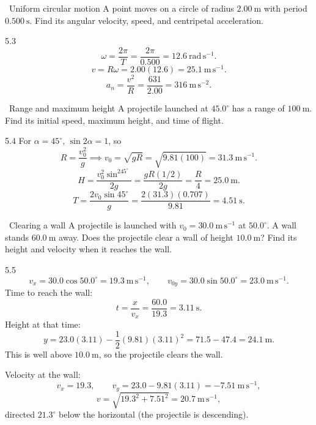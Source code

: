 \begin{exercise}{\warm\ Uniform circular motion}
A point moves on a circle of radius $2.00\ \mathrm{m}$ with period
$0.500\ \mathrm{s}$. Find its angular velocity, speed, and centripetal
acceleration.
\end{exercise}

\begin{tabletworkspace}[6.5cm]
\end{tabletworkspace}

\begin{solution}{5.3}
\[
\omega=\frac{2\pi}{T}=\frac{2\pi}{0.500}=12.6\ \mathrm{rad\,s^{-1}}.
\]
\[
v=R\omega=2.00(12.6)=25.1\ \mathrm{m\,s^{-1}}.
\]
\[
a_n=\frac{v^2}{R}=\frac{631}{2.00}=316\ \mathrm{m\,s^{-2}}.
\]
\end{solution}

\begin{exercise}{\core\ Range and maximum height}
A projectile launched at $45.0^\circ$ has a range of $100\ \mathrm{m}$. Find its
initial speed, maximum height, and time of flight.
\end{exercise}

\begin{tabletworkspace}[6.5cm]
\end{tabletworkspace}

\begin{solution}{5.4}
For $\alpha=45^\circ$, $\sin2\alpha=1$, so
\[
R=\frac{v_0^2}{g}
\implies
v_0=\sqrt{gR}=\sqrt{9.81(100)}=31.3\ \mathrm{m\,s^{-1}}.
\]
\[
H=\frac{v_0^2\sin^245^\circ}{2g}
=\frac{gR(1/2)}{2g}=\frac R4=25.0\ \mathrm{m}.
\]
\[
T=\frac{2v_0\sin45^\circ}{g}
=\frac{2(31.3)(0.707)}{9.81}=4.51\ \mathrm{s}.
\]
\end{solution}

\begin{exercise}{\core\ Clearing a wall}
A projectile is launched with $v_0=30.0\ \mathrm{m\,s^{-1}}$ at $50.0^\circ$.
A wall stands $60.0\ \mathrm{m}$ away. Does the projectile clear a wall of height
$10.0\ \mathrm{m}$? Find its height and velocity when it reaches the wall.
\end{exercise}

\begin{tabletworkspace}[6.5cm]
\end{tabletworkspace}

\begin{solution}{5.5}
\[
v_x=30.0\cos50.0^\circ=19.3\ \mathrm{m\,s^{-1}},\qquad
v_{0y}=30.0\sin50.0^\circ=23.0\ \mathrm{m\,s^{-1}}.
\]
Time to reach the wall:
\[
t=\frac{x}{v_x}=\frac{60.0}{19.3}=3.11\ \mathrm{s}.
\]
Height at that time:
\[
y=23.0(3.11)-\frac12(9.81)(3.11)^2
=71.5-47.4=24.1\ \mathrm{m}.
\]
This is well above $10.0\ \mathrm{m}$, so the projectile clears the wall.

Velocity at the wall:
\[
v_x=19.3,\qquad v_y=23.0-9.81(3.11)=-7.51\ \mathrm{m\,s^{-1}},
\]
\[
v=\sqrt{19.3^2+7.51^2}=20.7\ \mathrm{m\,s^{-1}},
\]
directed $21.3^\circ$ below the horizontal (the projectile is descending).
\end{solution}

